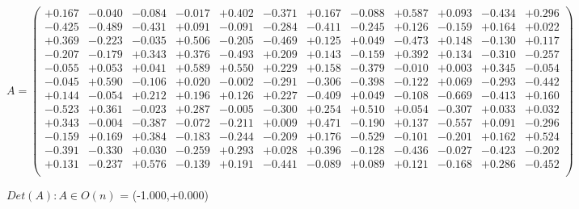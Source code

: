 \documentclass[9pt]{article}
\theoremstyle{plain}
\theoremstyle{definition}
\theoremstyle{remark}
\numberwithin{equation}{section}
\begin{document}
$A = \left(
\begin{array}{
cccccccccccc}
+0.167 & -0.040 & -0.084 & -0.017 & +0.402 & -0.371 & +0.167 & -0.088 & +0.587 & +0.093 & -0.434 & +0.296 \\
-0.425 & -0.489 & -0.431 & +0.091 & -0.091 & -0.284 & -0.411 & -0.245 & +0.126 & -0.159 & +0.164 & +0.022 \\
+0.369 & -0.223 & -0.035 & +0.506 & -0.205 & -0.469 & +0.125 & +0.049 & -0.473 & +0.148 & -0.130 & +0.117 \\
-0.207 & -0.179 & +0.343 & +0.376 & -0.493 & +0.209 & +0.143 & -0.159 & +0.392 & +0.134 & -0.310 & -0.257 \\
-0.055 & +0.053 & +0.041 & +0.589 & +0.550 & +0.229 & +0.158 & -0.379 & -0.010 & +0.003 & +0.345 & -0.054 \\
-0.045 & +0.590 & -0.106 & +0.020 & -0.002 & -0.291 & -0.306 & -0.398 & -0.122 & +0.069 & -0.293 & -0.442 \\
+0.144 & -0.054 & +0.212 & +0.196 & +0.126 & +0.227 & -0.409 & +0.049 & -0.108 & -0.669 & -0.413 & +0.160 \\
-0.523 & +0.361 & -0.023 & +0.287 & -0.005 & -0.300 & +0.254 & +0.510 & +0.054 & -0.307 & +0.033 & +0.032 \\
+0.343 & -0.004 & -0.387 & -0.072 & -0.211 & +0.009 & +0.471 & -0.190 & +0.137 & -0.557 & +0.091 & -0.296 \\
-0.159 & +0.169 & +0.384 & -0.183 & -0.244 & -0.209 & +0.176 & -0.529 & -0.101 & -0.201 & +0.162 & +0.524 \\
-0.391 & -0.330 & +0.030 & -0.259 & +0.293 & +0.028 & +0.396 & -0.128 & -0.436 & -0.027 & -0.423 & -0.202 \\
+0.131 & -0.237 & +0.576 & -0.139 & +0.191 & -0.441 & -0.089 & +0.089 & +0.121 & -0.168 & +0.286 & -0.452 \\
\end{array}
\right)$ \newline 

$Det(A) :   A \in O(n)$ = (-1.000,+0.000)
\end{document}
